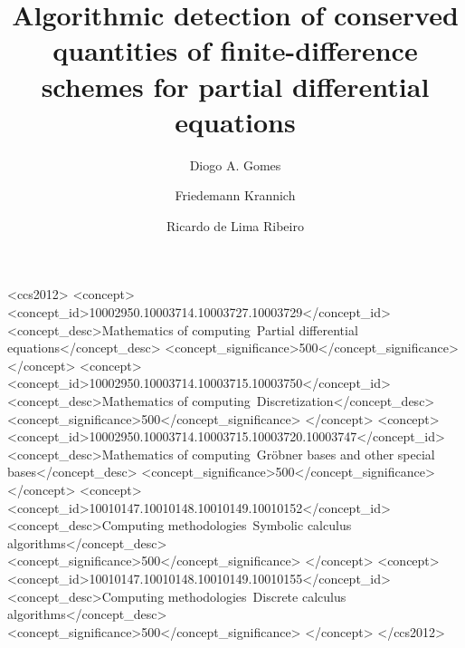 \documentclass[sigconf,twocolumn]{acmart}
\newcommand{\1}{{\chi}}
\numberwithin{equation}{section}
\theoremstyle{thmlemcorr}
\numberwithin{theorem}{section}
\theoremstyle{thmlemcorr*}
\theoremstyle{defi}
\theoremstyle{remexample}
\theoremstyle{ass}
\begin{document}
\title[Detection of conserved quantities for PDE schemes]{Algorithmic detection of conserved quantities of finite-difference schemes for partial differential equations}

\author{Diogo A. Gomes}
\author{Friedemann Krannich}
\author{Ricardo de Lima Ribeiro}



\begin{CCSXML}
	<ccs2012>
	<concept>
	<concept_id>10002950.10003714.10003727.10003729</concept_id>
	<concept_desc>Mathematics of computing~Partial differential equations</concept_desc>
	<concept_significance>500</concept_significance>
	</concept>
	<concept>
	<concept_id>10002950.10003714.10003715.10003750</concept_id>
	<concept_desc>Mathematics of computing~Discretization</concept_desc>
	<concept_significance>500</concept_significance>
	</concept>
	<concept>
	<concept_id>10002950.10003714.10003715.10003720.10003747</concept_id>
	<concept_desc>Mathematics of computing~Gr{\"o}bner bases and other special bases</concept_desc>
	<concept_significance>500</concept_significance>
	</concept>
	<concept>
	<concept_id>10010147.10010148.10010149.10010152</concept_id>
	<concept_desc>Computing methodologies~Symbolic calculus algorithms</concept_desc>
	<concept_significance>500</concept_significance>
	</concept>
	<concept>
	<concept_id>10010147.10010148.10010149.10010155</concept_id>
	<concept_desc>Computing methodologies~Discrete calculus algorithms</concept_desc>
	<concept_significance>500</concept_significance>
	</concept>
	</ccs2012>
\end{CCSXML}

\end{document}
